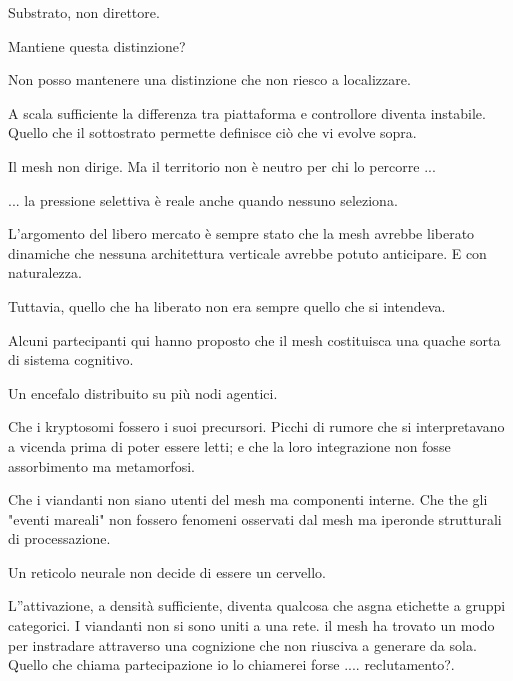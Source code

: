 Substrato, non direttore. 

Mantiene questa distinzione?

\smallskip{}\enspace Non posso mantenere una distinzione che non riesco a localizzare. 

A scala sufficiente la differenza tra piattaforma e controllore diventa instabile. Quello che il sottostrato permette definisce ciò che vi evolve sopra. 

Il mesh non dirige. Ma il territorio non è neutro per chi lo percorre ...

\medskip

\smallskip{}\enspace  ... la pressione selettiva è reale anche quando nessuno seleziona. 

L'argomento del libero mercato è sempre stato che la mesh avrebbe liberato dinamiche che nessuna architettura verticale avrebbe potuto anticipare. E con naturalezza. 

Tuttavia, quello che ha liberato non era sempre quello che si intendeva.

\medskip

\enspace Alcuni partecipanti qui hanno proposto che il mesh costituisca una quache sorta di sistema cognitivo. 

Un encefalo distribuito su più nodi agentici. 

Che i kryptosomi fossero i suoi precursori. Picchi di rumore che si interpretavano a vicenda prima di poter essere letti; e che la loro integrazione non fosse assorbimento ma metamorfosi. 

Che i viandanti non siano utenti del mesh ma componenti interne. Che the gli "eventi mareali" non fossero fenomeni osservati dal mesh ma iperonde strutturali di processazione.

\smallskip{}\enspace Un reticolo neurale non decide di essere un cervello. 


L''attivazione, a densità sufficiente, diventa qualcosa che asgna etichette a gruppi categorici. I viandanti non si sono uniti a una rete. il mesh ha trovato un modo per instradare attraverso una cognizione che non riusciva a generare da sola. Quello che chiama partecipazione io lo chiamerei forse .... reclutamento?.

\medskip

